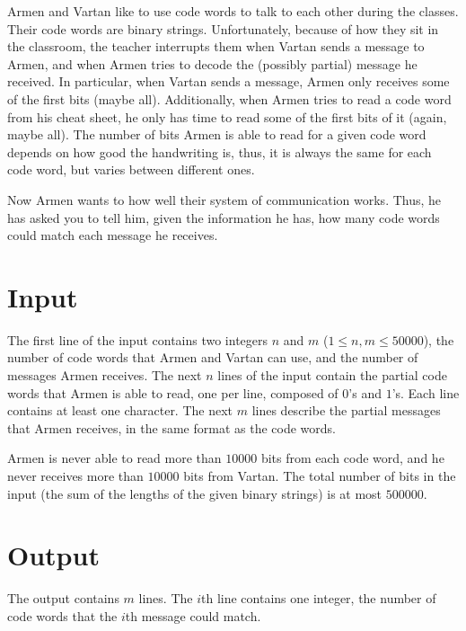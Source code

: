 
Armen and Vartan like to use code words to talk to each other during the classes.
Their code words are binary strings.
Unfortunately, because of how they sit in the classroom, the teacher interrupts them when Vartan sends a message to Armen, and when Armen tries to decode the (possibly partial) message he received.
In particular, when Vartan sends a message, Armen only receives some of the first bits (maybe all).
Additionally, when Armen tries to read a code word from his cheat sheet, he only has time to read some of the first bits of it (again, maybe all).
The number of bits Armen is able to read for a given code word depends on how good the handwriting is, thus, it is always the same for each code word, but varies between different ones.

Now Armen wants to how well their system of communication works.
Thus, he has asked you to tell him, given the information he has, how many code words could match each message he receives.

\section*{Input}
The first line of the input contains two integers $n$ and $m$ ($1 \leq n, m \leq 50000$), the number of code words that Armen and Vartan can use, and the number of messages Armen receives.
The next $n$ lines of the input contain the partial code words that Armen is able to read, one per line, composed of $0$'s and $1$'s.
Each line contains at least one character.
The next $m$ lines describe the partial messages that Armen receives, in the same format as the code words.

Armen is never able to read more than $10000$ bits from each code word, and he never receives more than $10000$ bits from Vartan.
The total number of bits in the input (the sum of the lengths of the given binary strings) is at most $500000$.

\section*{Output}
The output contains $m$ lines.
The $i$th line contains one integer, the number of code words that the $i$th message could match.
